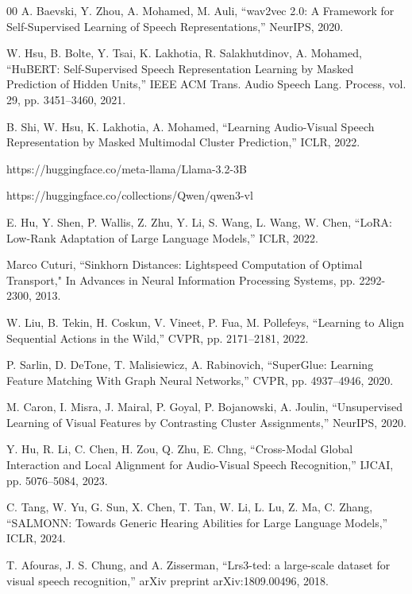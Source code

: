 \documentclass[conference]{IEEEtran}
\begin{document}
\begin{thebibliography}{00}
A. Baevski, Y. Zhou, A. Mohamed, M. Auli, ``wav2vec 2.0: A Framework for Self-Supervised Learning of Speech Representations,'' NeurIPS, 2020.

W. Hsu, B. Bolte, Y. Tsai, K. Lakhotia, R. Salakhutdinov, A. Mohamed, ``HuBERT: Self-Supervised Speech Representation Learning by Masked Prediction of Hidden Units,'' IEEE ACM Trans. Audio Speech Lang. Process, vol. 29, pp. 3451--3460, 2021.

B. Shi, W. Hsu, K. Lakhotia, A. Mohamed, ``Learning Audio-Visual Speech Representation by Masked Multimodal Cluster Prediction,'' ICLR, 2022.

https://huggingface.co/meta-llama/Llama-3.2-3B

https://huggingface.co/collections/Qwen/qwen3-vl

E. Hu, Y. Shen, P. Wallis, Z. Zhu, Y. Li, S. Wang, L. Wang, W. Chen, ``LoRA: Low-Rank Adaptation of Large Language Models,'' ICLR, 2022.

Marco Cuturi, ``Sinkhorn Distances: Lightspeed Computation of Optimal Transport," In Advances in Neural Information Processing Systems, pp. 2292-2300, 2013.

W. Liu, B. Tekin, H. Coskun, V. Vineet, P. Fua, M. Pollefeys, ``Learning to Align Sequential Actions in the Wild,'' CVPR, pp. 2171--2181, 2022.

P. Sarlin, D. DeTone, T. Malisiewicz, A. Rabinovich, ``SuperGlue: Learning Feature Matching With Graph Neural Networks,'' CVPR, pp. 4937--4946, 2020.

M. Caron, I. Misra, J. Mairal, P. Goyal, P. Bojanowski, A. Joulin, ``Unsupervised Learning of Visual Features by Contrasting Cluster Assignments,'' NeurIPS, 2020.

Y. Hu, R. Li, C. Chen, H. Zou, Q. Zhu, E. Chng, ``Cross-Modal Global Interaction and Local Alignment for Audio-Visual Speech Recognition,'' IJCAI, pp. 5076--5084, 2023.

C. Tang, W. Yu, G. Sun, X. Chen, T. Tan, W. Li, L. Lu, Z. Ma, C. Zhang, ``SALMONN: Towards Generic Hearing Abilities for Large Language Models,'' ICLR, 2024.

T. Afouras, J. S. Chung, and A. Zisserman, ``Lrs3-ted: a large-scale dataset for visual speech recognition,'' arXiv preprint arXiv:1809.00496, 2018.


\end{thebibliography}
\end{document}

